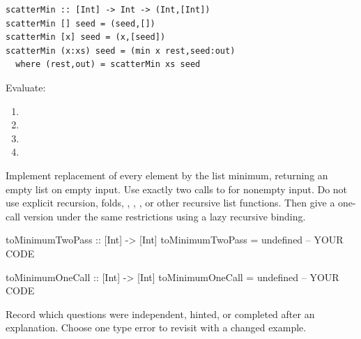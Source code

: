 \clearpage
{}
\par\noindent\begin{minipage}{\linewidth}
\begin{lstlisting}
scatterMin :: [Int] -> Int -> (Int,[Int])
scatterMin [] seed = (seed,[])
scatterMin [x] seed = (x,[seed])
scatterMin (x:xs) seed = (min x rest,seed:out)
  where (rest,out) = scatterMin xs seed
\end{lstlisting}
\end{minipage}\par
Evaluate:
\begin{enumerate}[label=(\alph*)]
\item {}
\answer{[Answer.]}
\item {}
\answer{[Answer.]}
\item {}
\answer{[Answer.]}
\item {}
\answer{[Answer.]}
\end{enumerate}
Implement replacement of every element by the list minimum, returning an empty
list on empty input. Use exactly two calls to  for nonempty input.
Do not use explicit recursion, folds, , , ,
or other recursive list functions. Then give a one-call version under the same
restrictions using a lazy recursive binding.
\par\noindent\begin{minipage}{\linewidth}
\begin{codeanswer}
toMinimumTwoPass :: [Int] -> [Int]
toMinimumTwoPass = undefined  -- YOUR CODE

toMinimumOneCall :: [Int] -> [Int]
toMinimumOneCall = undefined  -- YOUR CODE
\end{codeanswer}
\end{minipage}\par
{}

Record which questions were independent, hinted, or completed after an
explanation. Choose one type error to revisit with a changed example.
